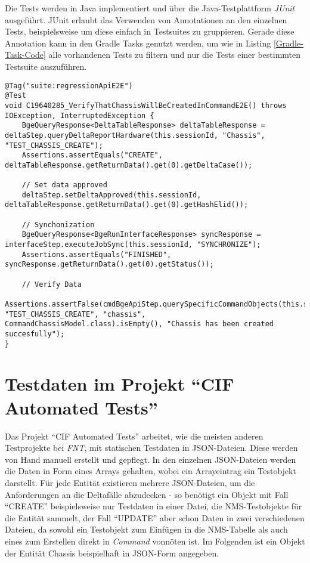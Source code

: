 Die Tests werden in Java implementiert und über die Java-Testplattform \textit{JUnit} ausgeführt. JUnit erlaubt das Verwenden von Annotationen an den einzelnen Tests, beispielsweise um diese einfach in Testsuites zu gruppieren. Gerade diese Annotation kann in den Gradle Tasks genutzt werden, um wie in Listing \ref{Gradle-Task-Code} alle vorhandenen Tests zu filtern und nur die Tests einer bestimmten Testsuite auszuführen. \cite{junit:2021}

\begin{lstlisting}[caption=Ein Test in JUnit mit Annotationen, label=JUnit-Test,style=Javastyle]
@Tag("suite:regressionApiE2E")
@Test
void C19640285_VerifyThatChassisWillBeCreatedInCommandE2E() throws IOException, InterruptedException {
	BgeQueryResponse<DeltaTableResponse> deltaTableResponse = deltaStep.queryDeltaReportHardware(this.sessionId, "Chassis", "TEST_CHASSIS_CREATE");
	Assertions.assertEquals("CREATE", deltaTableResponse.getReturnData().get(0).getDeltaCase());

	// Set data approved
	deltaStep.setDeltaApproved(this.sessionId, deltaTableResponse.getReturnData().get(0).getHashElid());

	// Synchonization
	BgeQueryResponse<BgeRunInterfaceResponse> syncResponse = interfaceStep.executeJobSync(this.sessionId, "SYNCHRONIZE");
	Assertions.assertEquals("FINISHED", syncResponse.getReturnData().get(0).getStatus());

	// Verify Data
	Assertions.assertFalse(cmdBgeApiStep.querySpecificCommandObjects(this.sessionId, "TEST_CHASSIS_CREATE", "chassis", CommandChassisModel.class).isEmpty(), "Chassis has been created succesfully");
}
\end{lstlisting}

\section{Testdaten im Projekt \enquote{CIF Automated Tests}}\label{sec:testdatenIst}
Das Projekt \enquote{CIF Automated Tests} arbeitet, wie die meisten anderen Testprojekte bei \textit{FNT}, mit statischen Testdaten in \ac{JSON}-Dateien. Diese werden von Hand manuell erstellt und gepflegt. In den einzelnen \ac{JSON}-Dateien werden die Daten in Form eines Arrays gehalten, wobei ein Arrayeintrag ein Testobjekt darstellt. Für jede Entität existieren mehrere \ac{JSON}-Dateien, um die Anforderungen an die Deltafälle abzudecken - so benötigt ein Objekt mit Fall \enquote{CREATE} beispielsweise nur Testdaten in einer Datei, die \ac{NMS}-Testobjekte für die Entität sammelt, der Fall \enquote{UPDATE} aber schon Daten in zwei verschiedenen Dateien, da sowohl ein Testobjekt zum Einfügen in die \ac{NMS}-Tabelle als auch eines zum Erstellen direkt in \textit{Command} vonnöten ist. Im Folgenden ist ein Objekt der Entität Chassis beispielhaft in \ac{JSON}-Form angegeben.

